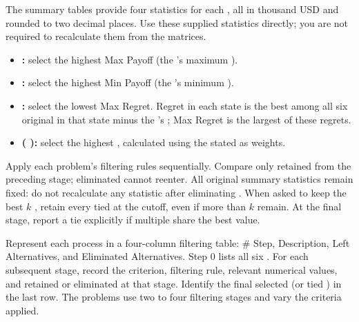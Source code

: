 The summary tables provide four statistics for each , all in thousand USD and rounded to two decimal places. Use these supplied statistics directly; you are not required to recalculate them from the  matrices.
\begin{itemize}
\item \textbf{:} select the highest Max Payoff (the 's maximum ).
\item \textbf{:} select the highest Min Payoff (the 's minimum ).
\item \textbf{ :} select the lowest Max Regret. Regret in each state is the best  among all six original  in that state minus the 's ; Max Regret is the largest of these regrets.
\item \textbf{ (  ):} select the highest , calculated using the stated  as  weights.
\end{itemize}
Apply each problem's filtering rules sequentially. Compare only  retained from the preceding stage; eliminated  cannot reenter. All original summary statistics remain fixed: do not recalculate any statistic after eliminating . When asked to keep the best $k$ , retain every  tied at the cutoff, even if more than $k$ remain. At the final stage, report a tie explicitly if multiple  share the best value.

Represent each process in a four-column filtering table: \# Step, Description, Left Alternatives, and Eliminated Alternatives. Step 0 lists all six . For each subsequent stage, record the criterion, filtering rule, relevant numerical values, and  retained or eliminated at that stage. Identify the final selected  (or tied ) in the last row. The problems use two to four filtering stages and vary the criteria applied.

